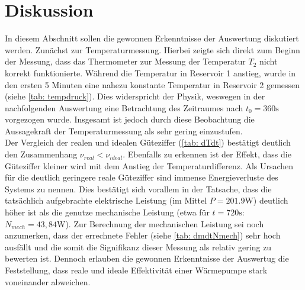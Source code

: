 \section{Diskussion}
In diesem Abschnitt sollen die gewonnen Erkenntnisse der Auswertung diskutiert werden. Zunächst zur Temperaturmessung.
Hierbei zeigte sich direkt zum Beginn der Messung, dass das Thermometer zur Messung der Temperatur $T_2$ nicht korrekt
funktionierte. Während die Temperatur in Reservoir 1 anstieg, wurde in den ersten 5 Minuten eine nahezu konstante Temperatur
in Reservoir 2 gemessen (siehe \ref{tab: tempdruck}). Dies widerspricht der Physik, weswegen in der nachfolgenden Auswertung
eine Betrachtung des Zeitraumes nach $t_0 = 360\si{\second}$ vorgezogen wurde. Insgesamt ist jedoch durch diese Beobachtung
die Aussagekraft der Temperaturmessung als sehr gering einzustufen. \\
Der Vergleich der realen und idealen Güteziffer (\ref{tab: dTdt}) bestätigt deutlich den Zusammenhang $\nu_{real} < \nu_{ideal}$. Ebenfalls
zu erkennen ist der Effekt, dass die Güteziffer kleiner wird mit dem Anstieg der Temperaturdifferenz. Als Ursachen für die deutlich
geringere reale Güteziffer sind immense Energieverluste des Systems zu nennen. Dies bestätigt sich vorallem in der Tatsache, dass die tatsächlich
aufgebrachte elektrische Leistung (im Mittel $P = 201.9 \si{\watt}$) deutlich höher ist als die genutze mechanische Leistung (etwa
für $t = 720 \si{\second}$: $N_{mech} = 43,84 \si{\watt}$). Zur Berechnung der mechanischen Leistung sei noch anzumerken, dass der errechnete
Fehler (siehe \ref{tab: dmdtNmech}) sehr hoch ausfällt und die somit die Signifikanz dieser Messung als relativ gering zu bewerten ist. Dennoch
erlauben die gewonnen Erkenntnisse der Auswertug die Feststellung, dass reale und ideale Effektivität einer Wärmepumpe stark voneinander abweichen.
